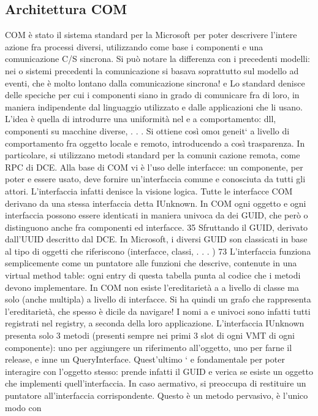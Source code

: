 \documentclass[a4paper,12pt]{article}
\begin{document}
\subsection{Architettura COM}
COM è stato il sistema standard per la Microsoft per poter descrivere l'intere
azione fra processi diversi, utilizzando come base i componenti e una comunicazione C/S sincrona. Si può notare la
differenza con i precedenti modelli: nei
o
sistemi precedenti la comunicazione si basava soprattutto sul modello ad eventi,
che è molto lontano dalla comunicazione sincrona!
e
Lo standard denisce delle speciche per cui i componenti siano in grado
di comunicare fra di loro, in maniera indipendente dal linguaggio utilizzato e
dalle applicazioni che li usano. L'idea è quella di introdurre una uniformità nel
e
a
comportamento: dll, componenti su macchine diverse, . . . Si ottiene così omo\i{}
geneit` a livello di comportamento fra oggetto locale e remoto, introducendo
a
così trasparenza. In particolare, si utilizzano metodi standard per la comuni\i{}
cazione remota, come RPC di DCE.
Alla base di COM vi è l'uso delle interfacce: un componente, per poter
e
essere usato, deve fornire un'interfaccia comune e conosciuta da tutti gli attori. L'interfaccia infatti denisce la
visione logica. Tutte le interfacce COM
derivano da una stessa interfaccia detta IUnknown. In COM ogni oggetto e ogni
interfaccia possono essere identicati in maniera univoca da dei GUID, che però
o
distinguono anche fra componenti ed interfacce.
35 Sfruttando il GUID, derivato dall'UUID descritto dal DCE. In Microsoft, i diversi GUID
son classicati in base al tipo di oggetti che riferiscono (interfacce, classi, . . . )
73
L'interfaccia funziona semplicemente come un puntatore alle funzioni che descrive, contenute in una virtual method
table: ogni entry di questa tabella punta
al codice che i metodi devono implementare. In COM non esiste l'ereditarietà
a
a livello di classe ma solo (anche multipla) a livello di interfacce. Si ha quindi
un grafo che rappresenta l'ereditarietà, che spesso è dicile da navigare! I nomi
a
e
univoci sono infatti tutti registrati nel registry, a seconda della loro applicazione.
L'interfaccia IUnknown presenta solo 3 metodi (presenti sempre nei primi
3 slot di ogni VMT di ogni componente): uno per aggiungere un riferimento
all'oggetto, uno per farne il release, e inne un QueryInterface. Quest'ultimo `
e
fondamentale per poter interagire con l'oggetto stesso: prende infatti il GUID e
verica se esiste un oggetto che implementi quell'interfaccia. In caso aermativo,
si preoccupa di restituire un puntatore all'interfaccia corrispondente. Questo è un metodo pervasivo, è l'unico modo con
\end{document}
